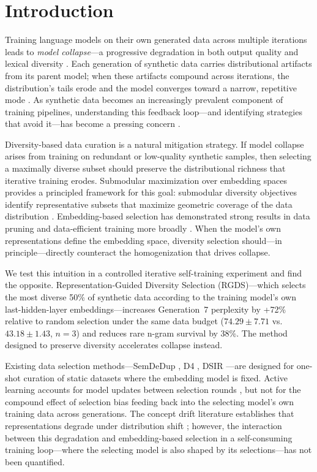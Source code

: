\section{Introduction}

Training language models on their own generated data across multiple iterations leads to \emph{model collapse}---a progressive degradation in both output quality and lexical diversity \citep{shumailov2024ai, alemohammad2024self}. Each generation of synthetic data carries distributional artifacts from its parent model; when these artifacts compound across iterations, the distribution's tails erode and the model converges toward a narrow, repetitive mode \citep{seddik2024how, briesch2023large, guo2024curious}. As synthetic data becomes an increasingly prevalent component of training pipelines, understanding this feedback loop---and identifying strategies that avoid it---has become a pressing concern \citep{dohmatob2025strong, gerstgrasser2024model}.

Diversity-based data curation is a natural mitigation strategy. If model collapse arises from training on redundant or low-quality synthetic samples, then selecting a maximally diverse subset should preserve the distributional richness that iterative training erodes. Submodular maximization over embedding spaces provides a principled framework for this goal: submodular diversity objectives identify representative subsets that maximize geometric coverage of the data distribution \citep{wei2015submodularity, mirzasoleiman2020coresets}. Embedding-based selection has demonstrated strong results in data pruning \citep{sorscher2022beyond} and data-efficient training more broadly \citep{xie2023data, xia2024less, engstrom2024dsdm}. When the model's own representations define the embedding space, diversity selection should---in principle---directly counteract the homogenization that drives collapse.

We test this intuition in a controlled iterative self-training experiment and find the opposite. Representation-Guided Diversity Selection (RGDS)---which selects the most diverse 50\% of synthetic data according to the training model's own last-hidden-layer embeddings---increases Generation~7 perplexity by +72\% relative to random selection under the same data budget ($74.29 \pm 7.71$ vs.\ $43.18 \pm 1.43$, $n{=}3$) and reduces rare n-gram survival by 38\%. The method designed to preserve diversity accelerates collapse instead.

Existing data selection methods---SemDeDup \citep{abbas2023semdedup}, D4 \citep{tirumala2023d4}, DSIR \citep{xie2023data}---are designed for one-shot curation of static datasets where the embedding model is fixed. Active learning accounts for model updates between selection rounds \citep{ash2020deep, kirsch2019batchbald}, but not for the compound effect of selection bias feeding back into the selecting model's own training data across generations. The concept drift literature establishes that representations degrade under distribution shift \citep{lu2019learning, gama2014survey}; however, the interaction between this degradation and embedding-based selection in a self-consuming training loop---where the selecting model is also shaped by its selections---has not been quantified.

